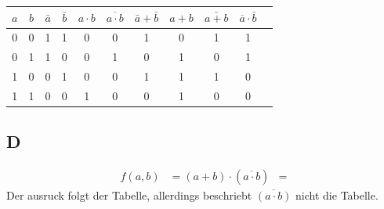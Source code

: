 \documentclass[10pt]{article}
\begin{document}
\begin{multicols}{2}
\begin{center}
		\label{tab:dis}
	\end{center}
	\begin{center}
		\begin{tabular}{|c|c|c|c|c|c|c|c|c|c|c|}
			\hline
			$a$ & $b$ & $\bar{a}$ & $\bar{b}$ & $a \cdot b$ & $\overline{a\cdot b}$ & $\bar{a} + \bar{b}$ & $a + b$ & $\bar{a + b}$ & $\overline{a} \cdot \bar{b}$ \\
			\hline
			0   & 0   & 1         & 1         & 0           & 0                     & 1                   & 0       & 1             & 1                            \\
			0   & 1   & 1         & 0         & 0           & 1                     & 0                   & 1       & 0             & 1                            \\
			1   & 0   & 0         & 1         & 0           & 0                     & 1                   & 1       & 1             & 0                            \\
			1   & 1   & 0         & 0         & 1           & 0                     & 0                   & 1       & 0             & 0                            \\
			\hline
		\end{tabular}
		\label{tab:morg}
	\end{center}
	\subsection*{D}
	\begin{align}
		f(a, b) & = (a + b) \cdot (\overline{a\cdot b})
		        & =
	\end{align}
	Der ausruck folgt der Tabelle, allerdings beschriebt $\overline{(a\cdot b)}$ nicht die Tabelle.

\end{multicols}
\end{document}
